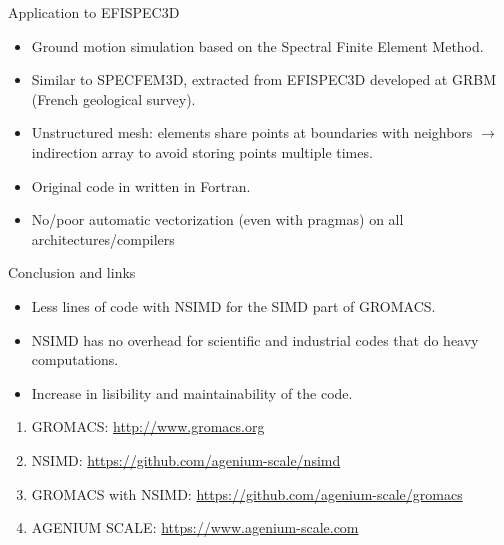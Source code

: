 \documentclass[shrink, compress, mathserif, 10pt, xcolor=dvipsnames,
               aspectratio=169]{beamer}
\begin{document}
\begin{frame}{Application to EFISPEC3D}
  \begin{itemize}
    \item Ground motion simulation based on the Spectral Finite Element Method.
    \item Similar to SPECFEM3D, extracted from EFISPEC3D developed at GRBM
          (French geological survey).
    \item Unstructured mesh: elements share points at boundaries with neighbors
          $\longrightarrow$ indirection array to avoid storing points multiple
          times.
    \item Original code in written in Fortran.
    \item No/poor automatic vectorization (even with pragmas) on all
          architectures/compilers
  \end{itemize}
\end{frame}

\begin{frame}{Conclusion and links}
  \begin{itemize}
    \item
      Less lines of code with NSIMD for the SIMD part of GROMACS.
    \item
      NSIMD has no overhead for scientific and industrial codes that do
      heavy computations.
    \item
      Increase in lisibility and maintainability of the code.
  \end{itemize}

  \vspace{2em}
  \begin{enumerate}
    \item GROMACS: \url{http://www.gromacs.org}
    \item NSIMD: \url{https://github.com/agenium-scale/nsimd}
    \item GROMACS with NSIMD: \url{https://github.com/agenium-scale/gromacs}
    \item AGENIUM SCALE: \url{https://www.agenium-scale.com}
  \end{enumerate}
\end{frame}
\end{document}
